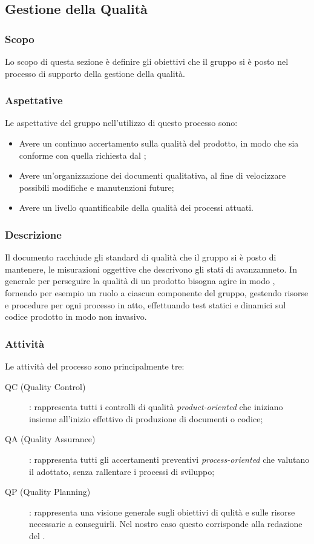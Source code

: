\subsection{Gestione della Qualità}
\subsubsection{Scopo}
Lo scopo di questa sezione è definire gli obiettivi che il gruppo si è posto nel processo di supporto della gestione della qualità. 

\subsubsection{Aspettative}
Le aspettative del gruppo \Gruppo{} nell'utilizzo di questo processo sono:
\begin{itemize}
	\item Avere un continuo accertamento sulla qualità del prodotto, in modo che sia conforme con quella richiesta dal ;
	\item Avere un'organizzazione dei documenti qualitativa, al fine di velocizzare possibili modifiche e manutenzioni future;
	\item Avere un livello quantificabile della qualità dei processi attuati.
\end{itemize}

\subsubsection{Descrizione}
Il documento \PdQv racchiude gli standard di qualità che il gruppo si è posto di mantenere, le misurazioni oggettive che descrivono gli stati di avanzamneto.
In generale per perseguire la qualità di un prodotto bisogna agire in modo , fornendo per esempio un ruolo a ciascun componente del gruppo, gestendo risorse e procedure per ogni processo in atto, effettuando test statici e dinamici sul codice prodotto in modo non invasivo.

\subsubsection{Attività}
Le attività del processo sono principalmente tre:
\begin{description}
	\item[QC (Quality Control)] : rappresenta tutti i controlli di qualità \textit{product-oriented} che iniziano insieme all'inizio effettivo di produzione di documenti o codice;
	\item[QA (Quality Assurance)] : rappresenta tutti gli accertamenti preventivi \textit{process-oriented} che valutano il  adottato, senza rallentare i processi di sviluppo;
	\item[QP (Quality Planning)] : rappresenta una visione generale sugli obiettivi di qulità e sulle risorse necessarie a conseguirli. Nel nostro caso questo corrisponde alla redazione del \PdQv.
\end{description}

